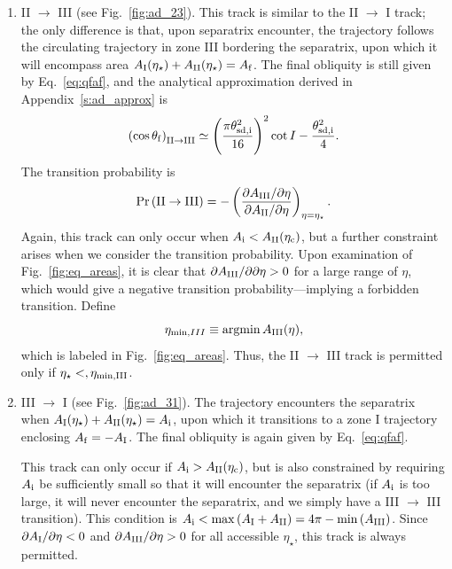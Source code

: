 \documentclass[twocolumn,twocolappendix]{aastex63}
\newcommand*{\pdil}[2]{\partial#1 / \partial#2}
\newcommand*{\p}[1]{\left(#1\right)}
\DeclareMathOperator*{\argmin}{argmin}
\begin{document}
\begin{enumerate}
    \item II $\to$ III (see Fig.~\ref{fig:ad_23}). This track is similar to the
        II $\to$ I track; the only difference is that, upon separatrix
        encounter, the trajectory follows the circulating trajectory in zone III
        bordering the separatrix, upon which it will encompass area $A_{\rm
        I}(\eta_\star) + A_{\rm II}(\eta_\star) = A_{\rm f}$. The final
        obliquity is still given by Eq.~\eqref{eq:qfaf}, and the analytical
        approximation derived in Appendix~\ref{s:ad_approx} is
        \begin{equation}
            \p{\cos \theta_{\rm f}}_{\rm II \to III} \simeq
                \p{\frac{\pi \theta_{\rm sd, i}^2}{16}}^2 \cot I
                    - \frac{\theta_{\rm sd, i}^2}{4}.\label{eq:qf_23_approx}
        \end{equation}
        The transition probability is
        \begin{equation}
            \Pr\p{\mathrm{II} \to \mathrm{III}} = -\p{
                \frac{\pdil{A_{\rm III}}{\eta}}{\pdil{A_{\rm II}}{\eta}}}
                    _{\eta = \eta_{\star}}.
        \end{equation}
        Again, this track can only occur when $A_{\rm i} < A_{\rm II}(\eta_{\rm
        c})$, but a further constraint arises when we consider the transition
        probability. Upon examination of Fig.~\ref{fig:eq_areas}, it is clear
        that $\pdil{A_{\rm III}}{\partial \eta} > 0$ for a large range of
        $\eta$, which would give a negative transition probability---implying
        a forbidden transition. Define
        \begin{equation}
            \eta_{\min, III} \equiv \argmin A_{\rm III}(\eta)
                \label{eq:eta_minIII},
        \end{equation}
        which is labeled in Fig.~\ref{fig:eq_areas}. Thus, the II $\to$ III
        track is permitted only if $\eta_\star <, \eta_{\rm \min, III}$.

    \item III $\to$ I (see Fig.~\ref{fig:ad_31}). The trajectory encounters the
        separatrix when $A_{\rm I}(\eta_\star) + A_{\rm II}(\eta_\star) =
        A_{\rm i}$, upon which it transitions to a zone I trajectory enclosing
        $A_{\rm f} = -A_{\rm I}$. The final obliquity is again given by
        Eq.~\eqref{eq:qfaf}.

        This track can only occur if $A_{\rm i} > A_{\rm II}(\eta_{\rm c})$,
        but is also constrained by requiring $A_{\rm i}$ be sufficiently small
        so that it will encounter the separatrix (if $A_{\rm i}$ is too large,
        it will never encounter the separatrix, and we simply have a III $\to$
        III transition). This condition is $A_{\rm i} < \max \p{A_{\rm I} +
        A_{\rm II}} = 4\pi - \min \p{A_{\rm III}}$.
        Since $\pdil{A_{\rm I}}{\eta} < 0$ and $\pdil{A_{\rm III}}{\eta} > 0$
        for all accessible $\eta_{\star}$, this track is always permitted.


\end{enumerate}
\end{document}

